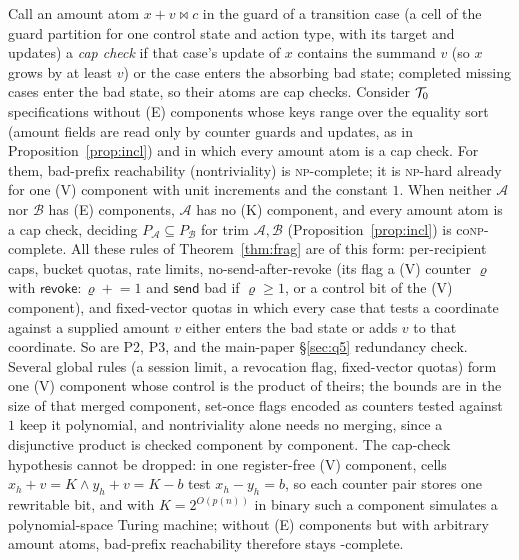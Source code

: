 \begin{proposition}\label{prop:core}
Call an amount atom $x+v\bowtie c$ in the guard of a transition case (a cell of the guard partition for one control state and action
type, with its target and updates) a \emph{cap check} if that case's update of $x$ contains the summand $v$ (so $x$ grows by at
least $v$) or the case enters the absorbing bad state; completed missing cases enter the bad state, so their atoms are cap checks. Consider
$\mathcal{T}_0$ specifications without (E) components whose keys range over the equality sort (amount fields are read only by counter
guards and updates, as in Proposition~\ref{prop:incl}) and in which every amount atom is a cap check. For them, bad-prefix
reachability (nontriviality) is \textsc{np}-complete; it is \textsc{np}-hard already for one (V) component with unit increments and
the constant $1$. When neither
$\mathcal A$ nor $\mathcal B$ has (E) components, $\mathcal A$ has no (K) component, and every amount atom is a cap check, deciding
$P_{\mathcal A}\subseteq P_{\mathcal B}$ for trim $\mathcal A,\mathcal B$ (Proposition~\ref{prop:incl}) is co\textsc{np}-complete. All these rules of Theorem~\ref{thm:frag} are of this form: per-recipient caps, bucket quotas, rate limits,
no-send-after-revoke (its flag a (V) counter $\varrho$ with $\mathsf{revoke}:\varrho\mathrel{+}=1$ and $\mathsf{send}$ bad if $\varrho\ge1$, or
a control bit of the (V) component), and fixed-vector quotas in which every case that tests a coordinate against a supplied amount
$v$ either enters the bad state or adds $v$ to that coordinate. So are P2, P3, and the main-paper \S\ref{sec:q5} redundancy check. Several global rules (a session limit, a revocation
flag, fixed-vector quotas) form one (V) component whose control is the product of theirs; the bounds are in the size of that
merged component, set-once flags encoded as counters tested against $1$ keep it polynomial, and nontriviality alone needs no
merging, since a disjunctive product is checked component by component. The cap-check hypothesis cannot be dropped: in one
register-free (V) component, cells $x_h+v=K\wedge y_h+v=K-b$ test $x_h-y_h=b$, so each counter pair stores one rewritable bit, and
with $K=2^{O(p(n))}$ in binary such a component simulates a polynomial-space Turing machine; without (E) components but with
arbitrary amount atoms, bad-prefix reachability therefore stays \PSPACE-complete.
\end{proposition}
